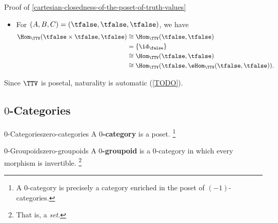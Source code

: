 \begin{Proof}{Proof of \cref{cartesian-closedness-of-the-poset-of-truth-values}}
\begin{itemize}
\begin{align*}
                                                          &\cong \Hom_{\TTV}(\tfalse,\eHom_{\TTV}(\tfalse,\ttrue)).
            \end{align*}
        \item For $(A,B,C)=(\tfalse,\tfalse,\tfalse)$, we have
            \begin{align*}
                \Hom_{\TTV}(\tfalse\times\tfalse,\tfalse) &\cong \Hom_{\TTV}(\tfalse,\tfalse)\\
                                                          &=     \{\id_{\false}\}\\
                                                          &\cong \Hom_{\TTV}(\tfalse,\tfalse)\\
                                                          &\cong \Hom_{\TTV}(\tfalse,\eHom_{\TTV}(\tfalse,\tfalse)).
            \end{align*}
    \end{itemize}
    Since $\TTV$ is posetal, naturality is automatic (\cref{TODO}).
\end{Proof}
\subsection{$0$-Categories}\label{subsection-zero-categories}
\begin{definition}{$0$-Categories}{zero-categories}%
    A \textbf{$0$-category} is a poset.%
    \footnote{%
        A $0$-category is precisely a category enriched in the poset of $(-1)$-categories.
        \par\vspace*{\TCBBoxCorrection}
    }%
\end{definition}
\begin{definition}{$0$-Groupoids}{zero-groupoids}%
    A \textbf{$0$-groupoid} is a $0$-category in which every morphism is invertible.%
    \footnote{%
        That is, a \emph{set}.
        \par\vspace*{\TCBBoxCorrection}
    }%
\end{definition}
